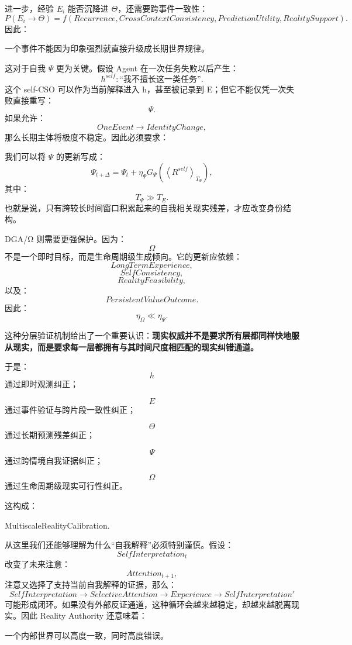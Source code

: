 进一步，经验 $E_i$ 能否沉降进 $\Theta$，还需要跨事件一致性：
\[
P(E_i\rightarrow\Theta)
=
f(
Recurrence,
CrossContextConsistency,
PredictionUtility,
RealitySupport
).
\]
因此：
\begin{statementbox}
\centering
{}
\end{statementbox}
一个事件不能因为印象强烈就直接升级成长期世界规律。

这对于自我 $\Psi$ 更为关键。假设 Agent 在一次任务失败以后产生：
\[
h^{self}:
\text{``我不擅长这一类任务''}.
\]
这个 self-CSO 可以作为当前解释进入 h，甚至被记录到 E；但它不能仅凭一次失败直接重写：
\[
\Psi.
\]
如果允许：
\[
OneEvent
\rightarrow
IdentityChange,
\]
那么长期主体将极度不稳定。因此必须要求：
\begin{statementbox}
\centering
{}
\end{statementbox}

我们可以将 $\Psi$ 的更新写成：
\[
\Psi_{t+\Delta}
=
\Psi_t
+
\eta_\Psi
G_\Psi
\left(
\left\langle
R^{self}
\right\rangle_{T_\Psi}
\right),
\]
其中：
\[
T_\Psi\gg T_E.
\]
也就是说，只有跨较长时间窗口积累起来的自我相关现实残差，才应改变身份结构。

DGA/Ω 则需要更强保护。因为：
\[
\Omega
\]
不是一个即时目标，而是生命周期级生成倾向。它的更新应依赖：
\[
LongTermExperience,
\]
\[
SelfConsistency,
\]
\[
RealityFeasibility,
\]
以及：
\[
PersistentValueOutcome.
\]
因此：
\[
\eta_\Omega
\ll
\eta_\Psi.
\]

这种分层验证机制给出了一个重要认识：\textbf{现实权威并不是要求所有层都同样快地服从现实，而是要求每一层都拥有与其时间尺度相匹配的现实纠错通道。}

于是：
\[
h
\]
通过即时观测纠正；

\[
E
\]
通过事件验证与跨片段一致性纠正；

\[
\Theta
\]
通过长期预测残差纠正；

\[
\Psi
\]
通过跨情境自我证据纠正；

\[
\Omega
\]
通过生命周期级现实可行性纠正。

这构成：
\begin{statementbox}
MultiscaleRealityCalibration.
\end{statementbox}

从这里我们还能够理解为什么``自我解释''必须特别谨慎。假设：
\[
SelfInterpretation_t
\]
改变了未来注意：
\[
Attention_{t+1},
\]
注意又选择了支持当前自我解释的证据，那么：
\[
SelfInterpretation
\rightarrow
SelectiveAttention
\rightarrow
Experience
\rightarrow
SelfInterpretation'
\]
可能形成闭环。如果没有外部反证通道，这种循环会越来越稳定，却越来越脱离现实。因此 Reality Authority 还意味着：
\begin{statementbox}
\centering
{}
\end{statementbox}
一个内部世界可以高度一致，同时高度错误。

